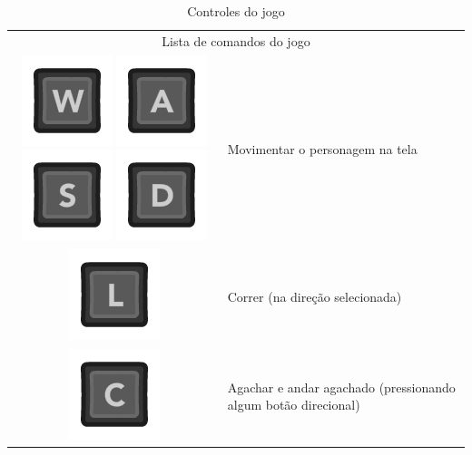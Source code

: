 \begin{longtable}{|c|p{10cm}|}
\caption{Controles do jogo}
\onehalfspacing
\\
\hline
\multicolumn{2}{|c|}{Lista de comandos do jogo}
\\
\hline
\includegraphics[scale=0.3]{images/kW.png} 
\includegraphics[scale=0.3]{images/kA.png}
\includegraphics[scale=0.3]{images/kS.png}
\includegraphics[scale=0.3]{images/kD.png}
& Movimentar o personagem na tela
\\
\hline
\includegraphics[scale=0.3]{images/kL.png}
 & Correr (na direção selecionada)
\\
\hline
\includegraphics[scale=0.3]{images/kC.png}
& Agachar e andar agachado (pressionando algum botão direcional)
\\

\end{longtable}
